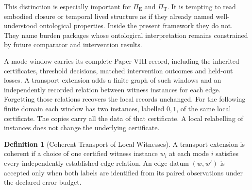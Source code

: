 \documentclass[11pt,a4paper]{article}
\theoremstyle{definition}
\newtheorem{definition}[theorem]{Definition}
\newcommand{\PiE}{\Pi_{\mathrm{E}}}
\newcommand{\PiT}{\Pi_{\mathrm{T}}}
\begin{document}
This distinction is especially important for $\PiE$ and $\PiT$. It is tempting to read embodied closure or temporal lived structure as if they already named well-understood ontological properties. Inside the present framework they do not. They name burden packages whose ontological interpretation remains constrained by future comparator and intervention results.

A mode window carries its complete Paper VIII record, including the inherited certificates, threshold decisions, matched intervention outcomes and held-out losses. A transport extension adds a finite graph of such windows and an independently recorded relation between witness instances for each edge. Forgetting those relations recovers the local records unchanged. For the following finite domain each window has two instances, labelled $0,1$, of the same local certificate. The copies carry all the data of that certificate. A local relabelling of instances does not change the underlying certificate.

\begin{definition}[Coherent Transport of Local Witnesses]\label{def:coherent-local-witnesses}
A transport extension is coherent if a choice of one certified witness instance $w_i$ at each mode $i$ satisfies every independently established edge relation. An edge datum $(w,w')$ is accepted only when both labels are identified from its paired observations under the declared error budget.
\end{definition}
\end{document}
